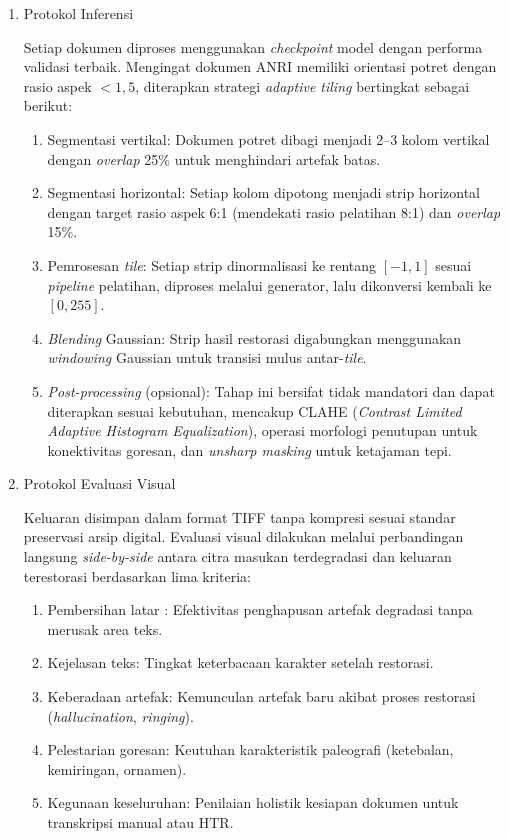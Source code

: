 \documentclass[12pt,a4paper]{article}
\begin{document}
\begin{enumerate}[leftmargin=1.5em, labelsep=0.5em, itemindent=0pt, label=\arabic*., topsep=0pt, partopsep=0pt]
    \item Protokol Inferensi

    Setiap dokumen diproses menggunakan \textit{checkpoint} model dengan performa validasi terbaik. Mengingat dokumen ANRI memiliki orientasi potret dengan rasio aspek $< 1{,}5$, diterapkan strategi \textit{adaptive tiling} bertingkat sebagai berikut:
    \begin{enumerate}[label=\alph*., leftmargin=1.5em, labelsep=0.5em, itemindent=0pt, noitemsep, topsep=0pt]
        \item Segmentasi vertikal: Dokumen potret dibagi menjadi 2--3 kolom vertikal dengan \textit{overlap} 25\% untuk menghindari artefak batas.
        \item Segmentasi horizontal: Setiap kolom dipotong menjadi strip horizontal dengan target rasio aspek 6:1 (mendekati rasio pelatihan 8:1) dan \textit{overlap} 15\%.
        \item Pemrosesan \textit{tile}: Setiap strip dinormalisasi ke rentang $[-1, 1]$ sesuai \textit{pipeline} pelatihan, diproses melalui generator, lalu dikonversi kembali ke $[0, 255]$.
        \item \textit{Blending} Gaussian: Strip hasil restorasi digabungkan menggunakan \textit{windowing} Gaussian untuk transisi mulus antar-\textit{tile}.
        \item \textit{Post-processing} (opsional): Tahap ini bersifat tidak mandatori dan dapat diterapkan sesuai kebutuhan, mencakup CLAHE (\textit{Contrast Limited Adaptive Histogram Equalization}), operasi morfologi penutupan untuk konektivitas goresan, dan \textit{unsharp masking} untuk ketajaman tepi.
    \end{enumerate}

    \item Protokol Evaluasi Visual

    Keluaran disimpan dalam format TIFF tanpa kompresi sesuai standar preservasi arsip digital. Evaluasi visual dilakukan melalui perbandingan langsung \textit{side-by-side} antara citra masukan terdegradasi dan keluaran terestorasi berdasarkan lima kriteria:
    \begin{enumerate}[label=\alph*., leftmargin=1.5em, labelsep=0.5em, itemindent=0pt, noitemsep, topsep=0pt]
        \item Pembersihan latar : Efektivitas penghapusan artefak degradasi tanpa merusak area teks.
        \item Kejelasan teks: Tingkat keterbacaan karakter setelah restorasi.
        \item Keberadaan artefak: Kemunculan artefak baru akibat proses restorasi (\textit{hallucination}, \textit{ringing}).
        \item Pelestarian goresan: Keutuhan karakteristik paleografi (ketebalan, kemiringan, ornamen).
        \item Kegunaan keseluruhan: Penilaian holistik kesiapan dokumen untuk transkripsi manual atau HTR.
    \end{enumerate}
\end{enumerate}
\end{document}

